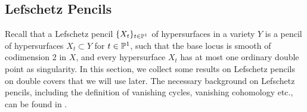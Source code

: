
\subsection{Lefschetz Pencils}
Recall that a Lefschetz pencil $\set{X_t}_{t \in \P^1}$ of hypersurfaces in a variety $Y$ is a pencil of hypersurfaces $X_t \subset Y$ for $t \in \P^1$, such that the base locus is smooth of codimension 2 in $X$, and every hypersurface $X_t$ has at most one ordinary double point as singularity. In this section, we collect some results on Lefschetz pencils on double covers that we will use later. The necessary background on Lefschetz pencils, including the definition of vanishing cycles, vanishing cohomology etc., can be found \eg in \cite{VoisinHodgeTheory2}.

